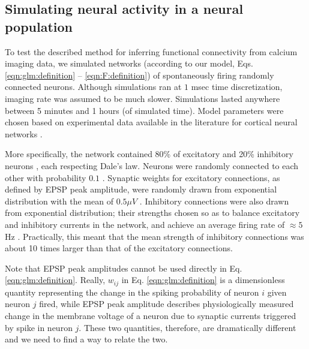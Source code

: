 \subsection{Simulating neural activity in a neural population} \label{sec:results:simulations}

To test the described method for inferring functional connectivity from calcium imaging data, we simulated networks (according to our model, Eqs. \ref{eqn:glm:definition} -- \ref{eqn:F:definition}) of spontaneously firing randomly connected neurons.  Although simulations ran at $1$ msec time discretization, imaging rate was assumed to be much slower. Simulations lasted anywhere between 5 minutes and 1 hours (of simulated time).  Model parameters were chosen based on experimental data available in the literature
for cortical neural networks \cite{Braitenberg1998,Urquijo2000,Lefort2009,Sayer1990}.

More specifically, the network contained 80\% of excitatory and 20\% inhibitory neurons \cite{Braitenberg1998,Urquijo2000}, each respecting Dale's law. Neurons were randomly connected to each other with probability $0.1$ \cite{Braitenberg1998,Lefort2009}.  Synaptic weights for excitatory connections, as defined by EPSP peak amplitude, were randomly drawn from exponential distribution with the mean of $0.5 \mu V$ \cite{Lefort2009,Sayer1990}.
Inhibitory connections were also drawn from exponential distribution; their strengths chosen so as to balance excitatory and inhibitory currents in the network, and achieve an average firing rate of  $\approx 5 $ Hz \cite{Abeles01}. Practically, this meant that the mean strength of inhibitory connections was about 10 times larger than that of the excitatory connections.

Note that EPSP peak amplitudes cannot be used directly in Eq. \ref{eqn:glm:definition}. Really, $w_{ij}$ in Eq. \ref{eqn:glm:definition} is a dimensionless quantity representing the change in the spiking probability of neuron $i$ given neuron $j$ fired, while EPSP peak amplitude describes physiologically measured change in the membrane voltage of a neuron due to synaptic currents triggered by spike in neuron $j$. These two quantities, therefore, are dramatically different and we need to find a way to relate the two.

